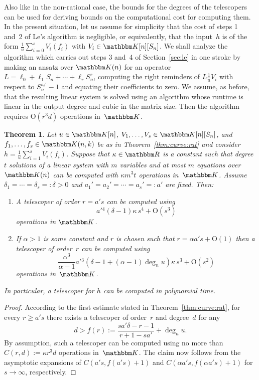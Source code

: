\documentclass{sig-alternate}
\newtheorem{theorem}{Theorem}
\let\set\mathbbm
\def\K{\set K}
\def\O{\mathrm{O}}
\def\deg{\operatorname{deg}}
\begin{document}
Also like in the non-rational case, the bounds for the degrees of the telescopers can be used for
deriving bounds on the computational cost for computing them. In the present situation,
let us assume for simplicity that the cost of steps 1 and~2 of Le's algorithm is negligible,
or equivalently, that the input~$h$ is of the form $\frac1u\sum_{i=0}^s V_i(f_i)$ with $V_i\in\K[n][S_n]$.
We shall analyze the algorithm which carries out steps 3 and~4 of Section~\ref{sec:le} in one
stroke by making an ansatz over $\K(n)$ for an operator~$L=\ell_0+\ell_1S_n+\cdots+\ell_rS_n^r$, computing
the right reminders of $L\frac1uV_i$ with respect to $S_n^{a_i'}-1$ and equating their coefficients to
zero. We assume, as before, that the resulting linear system is solved using an
algorithm whose runtime is linear in the output degree and cubic in the matrix size. Then
the algorithm requires $\O(r^3 d)$ operations in~$\K$.

\begin{theorem}\label{thm:rat:compl}
  Let $u\in\K[n]$, $V_1,\dots,V_s\in\K[n][S_n]$, and $f_1,\dots,f_s\in\K(n,k)$ be as in Theorem~\ref{thm:curve:rat}
  and consider $h=\frac1u\sum_{i=1}^s V_i(f_i)$.
  Suppose that $\kappa\in\set R$ is a constant such that degree $t$ solutions of a linear system
  with $m$ variables and at most $m$ equations over $\K(n)$ can be computed with $\kappa m^3 t$ operations
  in~$\K$. Assume $\delta_1=\cdots=\delta_s=:\delta>0$ and $a_1'=a_2'=\cdots=a_s'=:a'$ are fixed.
  Then:
  \begin{enumerate}
  \item A telescoper of order $r=a's$ can be computed using
  \[
    a'{}^4 (\delta-1) \kappa\,s^4 + \O(s^3)
  \]
  operations in $\K$.
  \item\label{it:rat:2} If $\alpha>1$ is some constant and $r$ is chosen such that
  $r=\alpha a's + \O(1)$
  then a telescoper of order~$r$ can be computed using
  \[
   \frac{\alpha^3}{\alpha-1}a'{}^3 (\delta-1+(\alpha-1)\deg_nu)\kappa\, s^3 + \O(s^2)
  \]
  operations in~$\K$.
  \end{enumerate}
  In particular, a telescoper for $h$ can be computed in polynomial time.
\end{theorem}
\begin{proof}
  According to the first estimate stated in Theorem~\ref{thm:curve:rat}, for every $r\geq a's$
  there exists a telescoper of order~$r$ and degree~$d$ for any
  \[
    d > f(r) := \frac{sa'\delta-r-1}{r+1-sa'} + \deg_nu.
  \]
  By assumption, such a telescoper can be computed using no more than $C(r,d) := \kappa r^3 d$
  operations in~$\K$. The claim now follows from the asymptotic expansions of $C(a's, f(a's)+1)$
  and $C(\alpha a's, f(\alpha a's)+1)$ for $s\to\infty$, respectively.
\end{proof}
\end{document}
